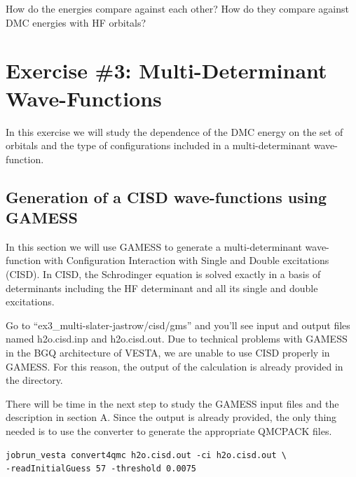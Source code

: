 How do the energies compare against each other? How do they compare against DMC
energies with HF orbitals?
\section{Exercise \#3: Multi-Determinant Wave-Functions}
In this exercise we will study the dependence of the DMC energy on the set of orbitals
and the type of configurations included in a multi-determinant wave-function. 

\subsection{Generation of a CISD wave-functions using GAMESS}
In this section we will use GAMESS to generate a multi-determinant wave-function with
Configuration Interaction with Single and Double excitations (CISD). In CISD, the Schrodinger equation is solved exactly in a basis of determinants 
including the HF determinant and all its single and double excitations. 

Go to ``ex3\_multi-slater-jastrow/cisd/gms'' and you'll see input and output files named h2o.cisd.inp and h2o.cisd.out. Due to technical problems with GAMESS in the BGQ architecture of VESTA, we are unable to use CISD properly in GAMESS. For this reason, the output of the calculation is  already provided in the directory. 


There will be time in the next step to study the GAMESS input
files and the description in section A. %
Since the output is already provided, the
only thing needed is to use the converter to generate the appropriate QMCPACK files.  %
\begin{shaded}
\begin{verbatim}
jobrun_vesta convert4qmc h2o.cisd.out -ci h2o.cisd.out \
-readInitialGuess 57 -threshold 0.0075
\end{verbatim}
\end{shaded}

